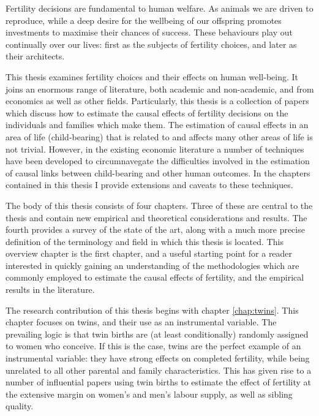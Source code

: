 Fertility decisions are fundamental to human welfare. As animals we are driven 
to reproduce, while a deep desire for the wellbeing of our offspring promotes 
investments to maximise their chances of success.  These behaviours play out 
continually over our lives: first as the subjects of fertility choices, and 
later as their architects.

This thesis examines fertility choices and their effects on human well-being.
It joins an enormous range of literature, both academic and non-academic, and
from economics as well as other fields.  Particularly, this thesis is a 
collection of papers which discuss how to estimate the causal effects of
fertility decisions on the individuals and families which make them.  The 
estimation of causal effects in an area of life (child-bearing) that is related 
to and affects many other areas of life is not trivial.  However, in the 
existing economic literature a number of techniques have been developed to 
circumnavegate the difficulties involved in the estimation of causal links
between child-bearing and other human outcomes.  In the chapters contained in 
this thesis I provide extensions and caveats to these techniques.

The body of this thesis consists of four chapters.  Three of these are central
to the thesis and contain new empirical and theoretical considerations and 
results.  The fourth provides a survey of the state of the art,
along with a much more precise definition of the terminology and field in
which this thesis is located.  This overview chapter is the first chapter,
and a useful starting point for a reader interested in quickly gaining an
understanding of the methodologies which are commonly employed to estimate the
causal effects of fertility, and the empirical results in the literature.

The research contribution of this thesis begins with chapter \ref{chap:twins}.
This chapter focuses on twins, and their use as an instrumental variable. The
prevailing logic is that twin births are (at least conditionally) randomly 
assigned to women who conceive.  If this is the case, twins are the perfect
example of an instrumental variable: they have strong effects on completed
fertility, while being unrelated to all other parental and family 
characteristics.  This has given rise to a number of influential papers using
twin births to estimate the effect of fertility at the extensive margin on
women's and men's labour supply, as well as sibling quality.

